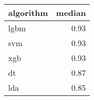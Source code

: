 \begin{tabular}{lr}
  \toprule
{\bfseries algorithm} & {\bfseries median} \\ 
  \midrule
lgbm & 0.93 \\ 
  svm & 0.93 \\ 
  xgb & 0.93 \\ 
  dt & 0.87 \\ 
  lda & 0.85 \\ 
   \bottomrule
\end{tabular}
